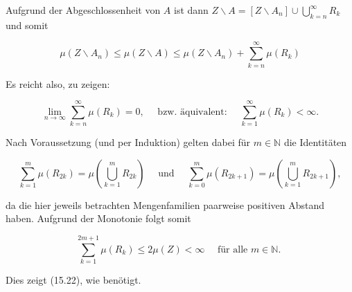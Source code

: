 \documentclass[10pt, letterpaper]{article}
\begin{document}
Aufgrund der Abgeschlossenheit von $A$ ist dann $Z \backslash A=\left[Z \backslash A_{n}\right] \cup \bigcup_{k=n}^{\infty} R_{k}$ und somit

$$
\mu\left(Z \backslash A_{n}\right) \leq \mu(Z \backslash A) \leq \mu\left(Z \backslash A_{n}\right)+\sum_{k=n}^{\infty} \mu\left(R_{k}\right)
$$

Es reicht also, zu zeigen:

$$
\lim _{n \rightarrow \infty} \sum_{k=n}^{\infty} \mu\left(R_{k}\right)=0, \quad \text { bzw. äquivalent: } \quad \sum_{k=1}^{\infty} \mu\left(R_{k}\right)<\infty .
$$

Nach Voraussetzung (und per Induktion) gelten dabei für $m \in \mathbb{N}$ die Identitäten

$$
\sum_{k=1}^{m} \mu\left(R_{2 k}\right)=\mu\left(\bigcup_{k=1}^{m} R_{2 k}\right) \quad \text { und } \quad \sum_{k=0}^{m} \mu\left(R_{2 k+1}\right)=\mu\left(\bigcup_{k=1}^{m} R_{2 k+1}\right),
$$

da die hier jeweils betrachten Mengenfamilien paarweise positiven Abstand haben. Aufgrund der Monotonie folgt somit

$$
\sum_{k=1}^{2 m+1} \mu\left(R_{k}\right) \leq 2 \mu(Z)<\infty \quad \text { für alle } m \in \mathbb{N} \text {. }
$$

Dies zeigt (15.22), wie benötigt.



\pagebreak
\printbibliography
\end{document}
